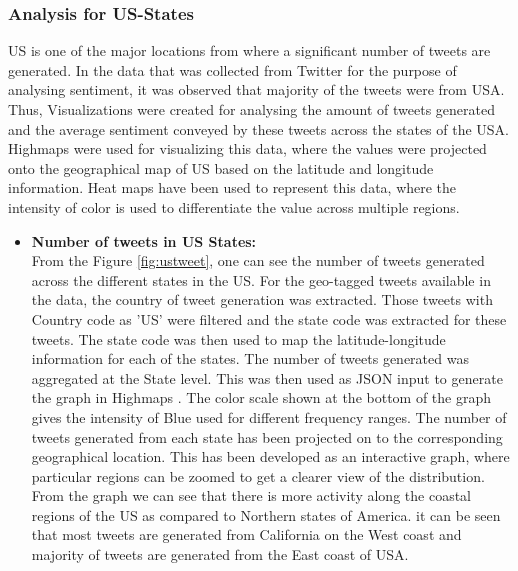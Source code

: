 \documentclass[9pt,twocolumn,twoside]{../../styles/osajnl}
\begin{document}
\subsubsection{Analysis for US-States}
US is one of the major locations from where a significant number of tweets are generated. In the data that was collected from Twitter for the purpose of analysing sentiment, it was observed that majority of the tweets were from USA. Thus, Visualizations were created for analysing the amount of tweets generated and the average sentiment conveyed by these tweets across the states of the USA. Highmaps \cite{www-highmaps} were used for visualizing this data, where the values were projected onto the geographical map of US based on the latitude and longitude information. Heat maps have been used to represent this data, where the intensity of color is used to differentiate the value across multiple regions. \begin{itemize}
    \item \textbf{Number of tweets in US States:}\\
    From the Figure \ref{fig:ustweet}, one can see the number of tweets generated across the different states in the US. For the geo-tagged tweets available in the data, the country of tweet generation was extracted. Those tweets with Country code as 'US' were filtered and the state code was extracted for these tweets. The state code was then used to map the latitude-longitude information for each of the states. The number of tweets generated was aggregated at the State level. This was then used as JSON input to generate the graph in Highmaps \cite{www-uscount}. The color scale shown at the bottom of the graph gives the intensity of Blue used for different frequency ranges. The number of tweets generated from each state has been projected on to the corresponding geographical location. This has been developed as an interactive graph, where particular regions can be zoomed to get a clearer view of the distribution. From the graph we can see that there is more activity along the coastal regions of the US as compared to Northern states of America. it can be seen that most tweets are generated from California on the West coast and majority of tweets are generated from the East coast of USA.  
    \begin{figure}[htbp]
    \centering

\end{figure}
\end{itemize}
\end{document}
